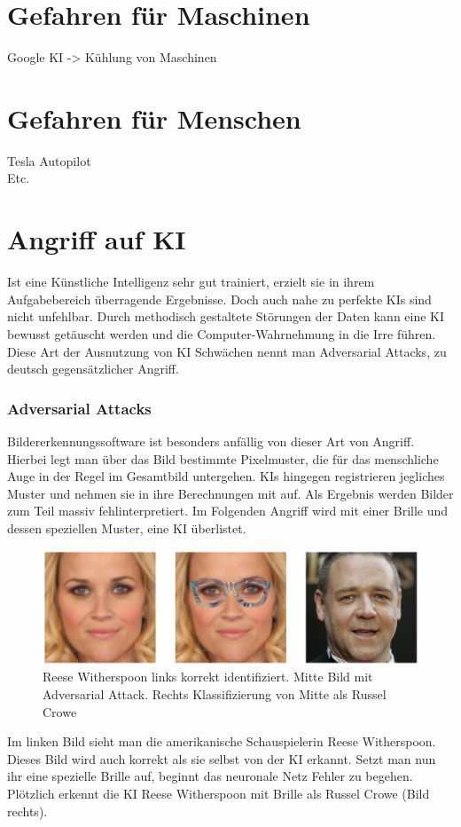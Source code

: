 \documentclass[12pt,oneside,a4paper,parskip]{scrbook}
\begin{document}
\section{Gefahren für Maschinen}
Google KI -> Kühlung von Maschinen
\section{Gefahren für Menschen}
Tesla Autopilot
\\Etc.
\section{Angriff auf KI}
Ist eine Künstliche Intelligenz sehr gut trainiert, erzielt sie in ihrem Aufgabebereich überragende Ergebnisse. Doch auch nahe zu perfekte KIs sind nicht unfehlbar. Durch methodisch gestaltete Störungen der Daten kann eine KI bewusst getäuscht werden und die Computer-Wahrnehmung in die Irre führen. Diese Art der Ausnutzung von KI Schwächen nennt man Adversarial Attacks, zu deutsch gegensätzlicher Angriff.
\subsubsection{Adversarial Attacks}
Bildererkennungssoftware ist besonders anfällig von dieser Art von Angriff. Hierbei legt man über das Bild bestimmte Pixelmuster, die für das menschliche Auge in der Regel im Gesamtbild untergehen. KIs hingegen registrieren jegliches Muster und nehmen sie in ihre Berechnungen mit auf. Als Ergebnis werden Bilder zum Teil massiv fehlinterpretiert. 
Im Folgenden Angriff wird mit einer Brille und dessen speziellen Muster, eine KI überlistet.
\label{section:BrilleAttack}
\begin{figure}[h]
	\begin{center}
		\includegraphics[width=15cm]{Bilder/Brille_Adversarial_Attack.png}
		\caption{Reese Witherspoon links korrekt identifiziert. Mitte Bild mit Adversarial Attack. Rechts Klassifizierung von Mitte als Russel Crowe}
		\label{fig:BrilleAttack}
	\end{center}
\end{figure}
Im linken Bild sieht man die amerikanische Schauspielerin Reese Witherspoon. Dieses Bild wird auch korrekt als sie selbst von der KI erkannt. Setzt man nun ihr eine spezielle Brille auf, beginnt das neuronale Netz Fehler zu begehen. Plötzlich erkennt die KI Reese Witherspoon mit Brille als Russel Crowe (Bild rechts).
\end{document}
